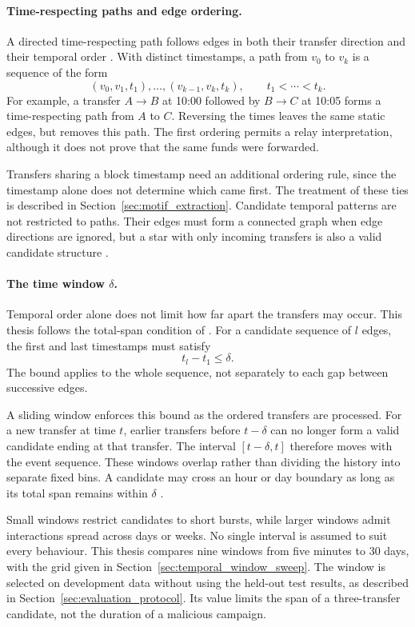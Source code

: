 \documentclass{thesisclass}
\begin{document}
\paragraph{Time-respecting paths and edge ordering.}
A directed time-respecting path follows edges in both their transfer direction
and their temporal order \citep{kovanen2011temporal}. With distinct timestamps,
a path from $v_0$ to $v_k$ is a sequence of the form
\[
    (v_0,v_1,t_1),\ldots,(v_{k-1},v_k,t_k),
    \qquad t_1 < \cdots < t_k.
\]
For example, a transfer
$A \to B$ at 10:00 followed by $B \to C$ at 10:05 forms a time-respecting path
from $A$ to $C$. Reversing the times leaves the same static edges, but removes
this path. The first ordering permits a relay interpretation, although it does
not prove that the same funds were forwarded.

Transfers sharing a block timestamp need an additional ordering rule, since the
timestamp alone does not determine which came first. The treatment of these ties
is described in Section~\ref{sec:motif_extraction}. Candidate temporal patterns
are not restricted to paths. Their edges must form a connected graph when edge
directions are ignored, but a star with only incoming transfers is also a valid
candidate structure \citep{paranjape2017motifs}.

\paragraph{The time window $\delta$.}
Temporal order alone does not limit how far apart the transfers may occur.
This thesis follows the total-span condition of \citet{paranjape2017motifs}.
For a candidate sequence of $l$ edges, the first and last timestamps must satisfy
\[
    t_l - t_1 \leq \delta.
\]
The bound applies to the whole sequence, not separately to each gap between
successive edges.

A sliding window enforces this bound as the ordered transfers are processed.
For a new transfer at time $t$, earlier transfers before $t-\delta$ can no
longer form a valid candidate ending at that transfer. The interval
$[t-\delta,t]$ therefore moves with the event sequence. These windows overlap
rather than dividing the history into separate fixed bins. A candidate may
cross an hour or day boundary as long as its total span remains within
$\delta$ \citep{paranjape2017motifs}.

Small windows restrict candidates to short bursts, while larger windows admit
interactions spread across days or weeks. No single interval is assumed to
suit every behaviour. This thesis compares nine windows from five minutes to
30 days, with the grid given in Section~\ref{sec:temporal_window_sweep}.
The window is selected on development data without using the held-out test
results, as described in Section~\ref{sec:evaluation_protocol}. Its value limits
the span of a three-transfer candidate, not the duration of a malicious campaign.
\end{document}
